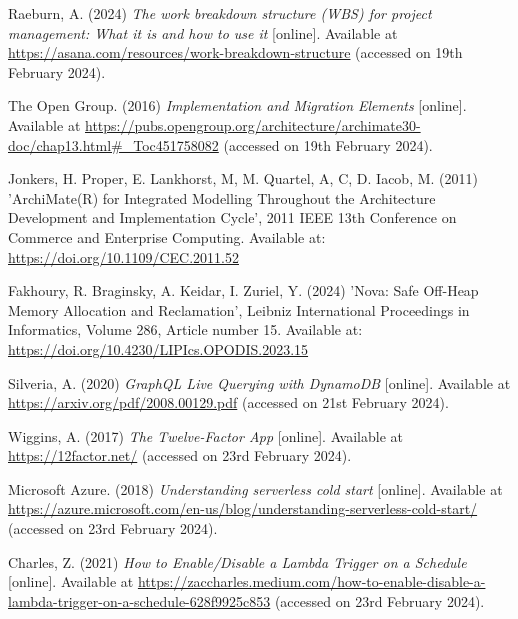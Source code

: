 \noindent Raeburn, A. (2024) \textit{The work breakdown structure (WBS) for project management: What it is and how to use it} [online]. Available at \url{https://asana.com/resources/work-breakdown-structure} (accessed on 19th February 2024).
\vspace{0.2cm}

\noindent The Open Group. (2016) \textit{Implementation and Migration Elements} [online]. Available at \url{https://pubs.opengroup.org/architecture/archimate30-doc/chap13.html#_Toc451758082} (accessed on 19th February 2024).
\vspace{0.2cm}

\noindent Jonkers, H. Proper, E. Lankhorst, M, M. Quartel, A, C, D. Iacob, M. (2011) 'ArchiMate(R) for Integrated Modelling Throughout the Architecture Development and Implementation Cycle', 2011 IEEE 13th Conference on Commerce and Enterprise Computing. Available at: \url{https://doi.org/10.1109/CEC.2011.52}
\vspace{0.2cm}

\noindent Fakhoury, R. Braginsky, A. Keidar, I. Zuriel, Y. (2024) 'Nova: Safe Off-Heap Memory Allocation and Reclamation', Leibniz International Proceedings in Informatics, Volume 286, Article number 15. Available at: \url{https://doi.org/10.4230/LIPIcs.OPODIS.2023.15}
\vspace{0.2cm}

\noindent Silveria, A. (2020) \textit{GraphQL Live Querying with DynamoDB} [online]. Available at \url{https://arxiv.org/pdf/2008.00129.pdf} (accessed on 21st February 2024).
\vspace{0.2cm}

\noindent Wiggins, A. (2017) \textit{The Twelve-Factor App} [online]. Available at \url{https://12factor.net/} (accessed on 23rd February 2024).
\vspace{0.2cm}

\noindent Microsoft Azure. (2018) \textit{Understanding serverless cold start} [online]. Available at \url{https://azure.microsoft.com/en-us/blog/understanding-serverless-cold-start/} (accessed on 23rd February 2024).
\vspace{0.2cm}

\noindent Charles, Z. (2021) \textit{How to Enable/Disable a Lambda Trigger on a Schedule} [online]. Available at \url{https://zaccharles.medium.com/how-to-enable-disable-a-lambda-trigger-on-a-schedule-628f9925c853} (accessed on 23rd February 2024).
\vspace{0.2cm}

